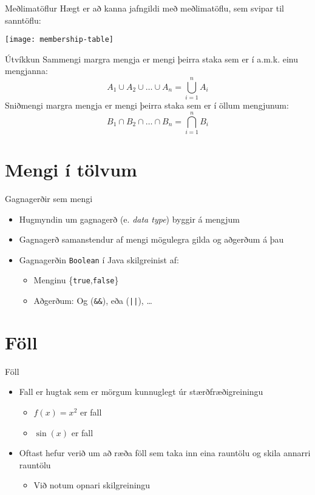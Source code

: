 \documentclass[handout]{beamer}
\begin{document}
\begin{frame}{Meðlimatöflur}
Hægt er að kanna jafngildi með meðlimatöflu, sem svipar til sanntöflu:
\begin{center}
\texttt{[image: membership-table]}
\end{center}
\end{frame}

\begin{frame}{Útvíkkun}
Sammengi margra mengja er mengi þeirra staka sem er í a.m.k. einu mengjanna:
\[
 A_1 \cup A_2 \cup \ldots \cup A_n = \bigcup_{i=1}^n A_i
\]
Sniðmengi margra mengja er mengi þeirra staka sem er í öllum mengjunum:
\[
 B_1 \cap B_2 \cap \ldots \cap B_n = \bigcap_{i=1}^n B_i
\]
\end{frame}

\section{Mengi í tölvum}

\begin{frame}[fragile]{Gagnagerðir sem mengi}
 \begin{itemize}
  \item Hugmyndin um gagnagerð (e. \emph{data type}) byggir á mengjum
  \item Gagnagerð samanstendur af mengi mögulegra gilda og aðgerðum á þau
  \item Gagnagerðin \texttt{Boolean} í Java skilgreinist af:
  \begin{itemize}
   \item Menginu \{\texttt{true},\texttt{false}\}
   \item Aðgerðum: Og (\verb|&&|), eða (\verb&||&), \ldots
  \end{itemize}
 \end{itemize}
\end{frame}

\section{Föll}

\begin{frame}{Föll}
\begin{itemize}
 \item Fall er hugtak sem er mörgum kunnuglegt úr stærðfræðigreiningu
 \begin{itemize}
  \item $f(x) = x^2$ er fall
  \item $\sin(x)$ er fall
 \end{itemize}
 \item Oftast hefur verið um að ræða föll sem taka inn eina rauntölu og skila annarri rauntölu
 \begin{itemize}
  \item Við notum opnari skilgreiningu
 \end{itemize}
\end{itemize}
\end{frame}
\end{document}
